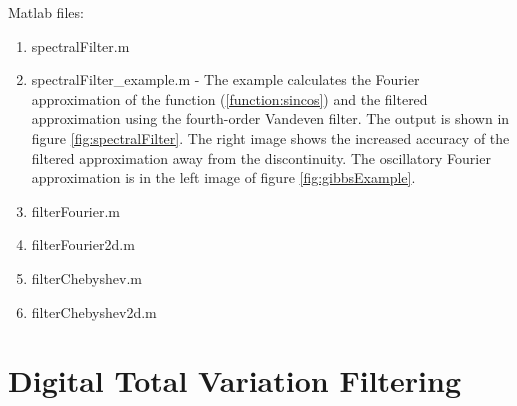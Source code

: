\documentclass[12pt]{article}
\begin{document}
Matlab files:
\begin{enumerate}
    \item spectralFilter.m
    \item spectralFilter\_example.m -
    The example calculates the Fourier approximation of the function (\ref{function:sincos})
   and the filtered approximation using the fourth-order Vandeven
   filter.  The output is shown in figure \ref{fig:spectralFilter}.
   The right image shows the increased accuracy of the filtered
   approximation away from the discontinuity.  The oscillatory Fourier approximation is in
   the left image of figure \ref{fig:gibbsExample}.
    \item filterFourier.m
    \item filterFourier2d.m
    \item filterChebyshev.m
    \item filterChebyshev2d.m
\end{enumerate}

\section{Digital Total Variation Filtering}
\end{document}
